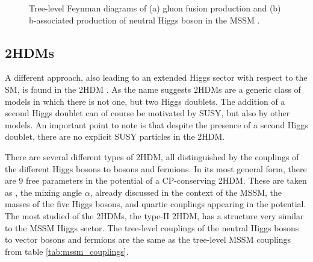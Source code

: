 \begin{figure}[h!]
\begin{center}
\end{center}
\caption{Tree-level Feynman diagrams of (a) gluon fusion production and (b) b-associated
production of neutral Higgs boson in the MSSM \cite{CMS-PAS-HIG-16-037}.}
\label{fig:production_mssm}
\end{figure}

\subsection{\acl{2HDM}s}
\label{sec:theory_2HDM}
A different approach, also leading to an extended Higgs sector with
respect to the \ac{SM}, is found in the \ac{2HDM} \cite{2HDM-I,2HDM-II}.
As the name suggests \ac{2HDM}s are a generic class of models in which
there is not one, but two Higgs doublets. The addition of a second
Higgs doublet can of course be motivated by \ac{SUSY}, but also by other models.
An important point to note is that despite the presence of a second 
Higgs doublet, there are no explicit \ac{SUSY} particles in the \ac{2HDM}.

There are several different types of \ac{2HDM}, all distinguished by the couplings
of the different Higgs bosons to bosons and fermions. In its most general
form, there are 9 free parameters in the potential of a CP-conserving 2HDM. 
These are taken as \tanb, the mixing angle $\alpha$, already discussed in 
the context of the \ac{MSSM}, the masses of the five Higgs bosons,
and quartic couplings appearing in the potential. The most studied of the
\ac{2HDM}s, the type-II \ac{2HDM}, has a structure very similar to 
the MSSM Higgs sector. The tree-level couplings of the neutral Higgs bosons to 
vector bosons and fermions are the same as the tree-level \ac{MSSM} couplings 
from table \ref{tab:mssm_couplings}. %

